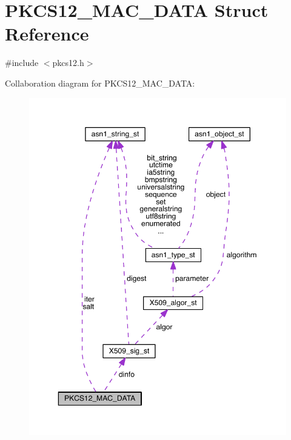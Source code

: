 \hypertarget{struct_p_k_c_s12___m_a_c___d_a_t_a}{}\section{P\+K\+C\+S12\+\_\+\+M\+A\+C\+\_\+\+D\+A\+TA Struct Reference}
\label{struct_p_k_c_s12___m_a_c___d_a_t_a}


{\ttfamily \#include $<$pkcs12.\+h$>$}



Collaboration diagram for P\+K\+C\+S12\+\_\+\+M\+A\+C\+\_\+\+D\+A\+TA\+:\nopagebreak
\begin{figure}[H]
\begin{center}
\leavevmode
\includegraphics[width=350pt]{struct_p_k_c_s12___m_a_c___d_a_t_a__coll__graph}
\end{center}
\end{figure}
